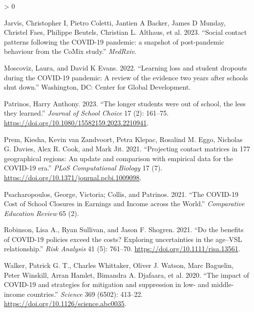 \documentclass[
]{article}
\newlength{\cslhangindent}
\newenvironment{CSLReferences}[2] %
 {%
  \setlength{\parindent}{0pt}
  \ifodd #1 \everypar{\setlength{\hangindent}{\cslhangindent}}\ignorespaces\fi
  \ifnum #2 > 0
  \setlength{\parskip}{#2\baselineskip}
  \fi
 }%
 {}
\begin{document}
\begin{CSLReferences}{1}{0}
\leavevmode\hypertarget{ref-Jarvis2023}{}%
Jarvis, Christopher I, Pietro Coletti, Jantien A Backer, James D Munday, Christel Faes, Philippe Beutels, Christian L. Althaus, et al. 2023. {``{Social contact patterns following the COVID-19 pandemic: a snapshot of post-pandemic behaviour from the CoMix study}.''} \emph{MedRxiv}.

\leavevmode\hypertarget{ref-Moscoviz2022}{}%
Moscoviz, Laura, and David K Evans. 2022. {``{Learning loss and student dropouts during the COVID-19 pandemic: A review of the evidence two years after schools shut down}.''} Washington, DC: Center for Global Development.

\leavevmode\hypertarget{ref-Patrinos2023}{}%
Patrinos, Harry Anthony. 2023. {``{The longer students were out of school, the less they learned}.''} \emph{Journal of School Choice} 17 (2): 161--75. \url{https://doi.org/10.1080/15582159.2023.2210941}.

\leavevmode\hypertarget{ref-Prem2021}{}%
Prem, Kiesha, Kevin van Zandvoort, Petra Klepac, Rosalind M. Eggo, Nicholas G. Davies, Alex R. Cook, and Mark Jit. 2021. {``{Projecting contact matrices in 177 geographical regions: An update and comparison with empirical data for the COVID-19 era}.''} \emph{PLoS Computational Biology} 17 (7). \url{https://doi.org/10.1371/journal.pcbi.1009098}.

\leavevmode\hypertarget{ref-Psacharopoulos2021a}{}%
Psacharopoulos, George, Victoria; Collis, and Patrinos. 2021. {``{The COVID-19 Cost of School Closures in Earnings and Income across the World}.''} \emph{Comparative Education Review} 65 (2).

\leavevmode\hypertarget{ref-Robinson2021}{}%
Robinson, Lisa A., Ryan Sullivan, and Jason F. Shogren. 2021. {``{Do the benefits of COVID-19 policies exceed the costs? Exploring uncertainties in the age--VSL relationship}.''} \emph{Risk Analysis} 41 (5): 761--70. \url{https://doi.org/10.1111/risa.13561}.

\leavevmode\hypertarget{ref-Walker2020}{}%
Walker, Patrick G. T., Charles Whittaker, Oliver J. Watson, Marc Baguelin, Peter Winskill, Arran Hamlet, Bimandra A. Djafaara, et al. 2020. {``{The impact of COVID-19 and strategies for mitigation and suppression in low- and middle-income countries}.''} \emph{Science} 369 (6502): 413--22. \url{https://doi.org/10.1126/science.abc0035}.

\end{CSLReferences}
\end{document}
